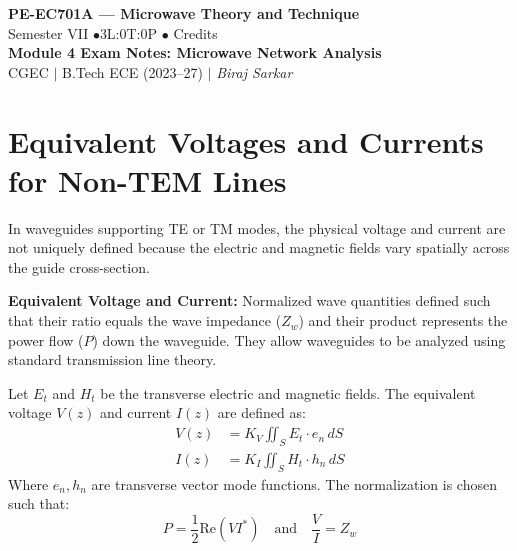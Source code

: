 \documentclass[12pt,a4paper]{article}
\begin{document}

\begin{center}
  {\LARGE\bfseries\color{myred} PE-EC701A --- Microwave Theory and Technique}\\[5pt]
  {\normalsize\color{mydark} Semester VII \quad$\bullet$\quad 3L:0T:0P \quad$\bullet$ Credits}\\[3pt]
  {\normalsize\color{myteal}\textbf{Module 4 Exam Notes: Microwave Network Analysis}}\\[3pt]
  {\small\color{mydark} CGEC \;$|$\; B.Tech ECE (2023--27) \;$|$\; \textit{Biraj Sarkar}}
\end{center}
\vspace{2pt}
\noindent{\color{myred}\rule{\linewidth}{1.5pt}}
\vspace{2pt}

\hypersetup{linkcolor=mydark}
\tableofcontents
\hypersetup{linkcolor=myteal}
\newpage

\section{Equivalent Voltages and Currents for Non-TEM Lines}

In waveguides supporting TE or TM modes, the physical voltage and current are not uniquely defined because the electric and magnetic fields vary spatially across the guide cross-section. 

\begin{tcolorbox}[defbox]
\textbf{Equivalent Voltage and Current:} Normalized wave quantities defined such that their ratio equals the wave impedance ($Z_w$) and their product represents the power flow ($P$) down the waveguide. They allow waveguides to be analyzed using standard transmission line theory.
\end{tcolorbox}

Let $E_t$ and $H_t$ be the transverse electric and magnetic fields. The equivalent voltage $V(z)$ and current $I(z)$ are defined as:
\begin{align}
  V(z) &= K_V \iint_{S} E_t \cdot e_n \,dS \\
  I(z) &= K_I \iint_{S} H_t \cdot h_n \,dS
\end{align}
Where $e_n, h_n$ are transverse vector mode functions. The normalization is chosen such that:
\begin{equation}
  P = \frac{1}{2} \text{Re}(V I^*) \quad \text{and} \quad \frac{V}{I} = Z_w
\end{equation}
\end{document}
